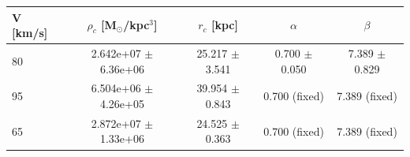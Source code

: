 \begin{tabular}{lcccc}
\toprule
V [km/s] & $\rho_c$ [M$_\odot$/kpc$^3$] & $r_c$ [kpc] & $\alpha$ & $\beta$ \\
\midrule
80 & 2.642e+07 $\pm$ 6.36e+06 & 25.217 $\pm$ 3.541 & 0.700 $\pm$ 0.050 & 7.389 $\pm$ 0.829 \\
95 & 6.504e+06 $\pm$ 4.26e+05 & 39.954 $\pm$ 0.843 & 0.700 (fixed) & 7.389 (fixed) \\
65 & 2.872e+07 $\pm$ 1.33e+06 & 24.525 $\pm$ 0.363 & 0.700 (fixed) & 7.389 (fixed) \\
\bottomrule
\end{tabular}
